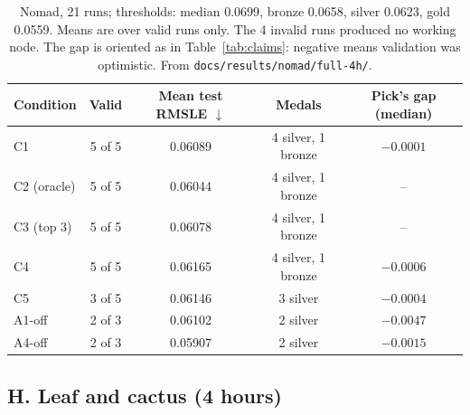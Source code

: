 \documentclass[11pt]{article}
\begin{document}
\begin{table}[H]
\centering
\small
\begin{tabular}{@{}lcccc@{}}
\toprule
\textbf{Condition} & \textbf{Valid} & \textbf{Mean test RMSLE} $\downarrow$
& \textbf{Medals} & \textbf{Pick's gap (median)} \\
\midrule
C1 & 5 of 5 & 0.06089 & 4 silver, 1 bronze & $-0.0001$ \\
C2 (oracle) & 5 of 5 & 0.06044 & 4 silver, 1 bronze & -- \\
C3 (top 3) & 5 of 5 & 0.06078 & 4 silver, 1 bronze & -- \\
C4 & 5 of 5 & 0.06165 & 4 silver, 1 bronze & $-0.0006$ \\
C5 & 3 of 5 & 0.06146 & 3 silver & $-0.0004$ \\
A1-off & 2 of 3 & 0.06102 & 2 silver & $-0.0047$ \\
A4-off & 2 of 3 & 0.05907 & 2 silver & $-0.0015$ \\
\bottomrule
\end{tabular}
\caption{Nomad, 21 runs; thresholds: median 0.0699, bronze 0.0658, silver 0.0623,
gold 0.0559. Means are over valid runs only. The 4 invalid runs produced no working
node. The gap is oriented as in Table~\ref{tab:claims}: negative means validation was optimistic. From
\texttt{docs/results/nomad/full-4h/}.}
\end{table}

\subsection*{H. Leaf and cactus (4 hours)}
\end{document}
